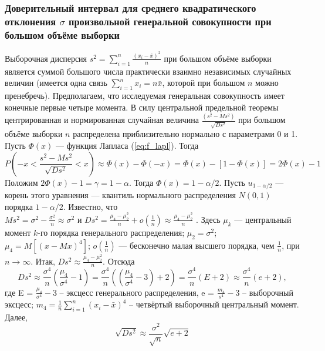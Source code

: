 \subsubsection{Доверительный интервал для среднего квадратического отклонения $\sigma$ произвольной генеральной совокупности при большом объёме выборки}
Выборочная дисперсия $s^{2} = \sum_{i = 1}^{n}{\frac{(x_{i} - \bar{x})^{2}}{n}}$ при большом объёме выборки является суммой большого числа практически взаимно независимых случайных величин (имеется одна связь $\sum_{i=1}^{n}{x_{i}} = n\bar{x}$, которой при большом $n$ можно пренебречь). Предполагаем, что исследуемая генеральная совокупность имеет конечные первые четыре момента.
\newline
В силу центральной предельной теоремы центрированная и нормированная случайная величина $\frac{(s^{2}-Ms^{2})}{\sqrt{D s^{2}}}$ при большом объёме выборки $n$ распределена приблизительно нормально с параметрами 0 и 1. Пусть $\Phi(x)$ — функция Лапласа (\ref{eq:f_lapl}). Тогда
\begin{equation}
	P\left(-x < \frac{s^{2}-Ms^{2}}{\sqrt{D s^{2}}} < x\right)
	\approx \Phi(x) - \Phi(-x)=\Phi(x) - [1 - \Phi(x)] = 2\Phi(x) - 1
	\label{eq:P_as_sigma}
\end{equation}
Положим $2\Phi(x)-1 = \gamma = 1-\alpha$. Тогда $\Phi(x) = 1-\alpha/2$. Пусть $u_{1-\alpha/2}$ — корень этого уравнения — квантиль нормального распределения $N(0,1)$ порядка $1-\alpha/2$. Известно, что $Ms^{2} = \sigma^{2} -\frac{\sigma^{2}}{n} \approx \sigma^{2} \text{ и } D s^{2} = \frac{\mu_{4} -\mu_{2}^{2}}{n} + o(\frac{1}{n}) \approx \frac{\mu_{4} -\mu_{2}^{2}}{n}$ . Здесь $\mu_{k}$ — центральный момент $k$-го порядка генерального распределения; $\mu_{2} = \sigma^{2}$; $\mu_{4} = M[(x-M x)^{4}]$︀; $o(\frac{1}{n})$ — бесконечно малая высшего порядка, чем $\frac{1}{n}$, при $n\rightarrow \infty$. Итак, $D s^{2} \approx \frac{\mu_{4} -\mu_{2}^{2}}{n}$. Отсюда
\begin{equation}
	D s^{2} \approx \frac{\sigma^{4}}{n}(\frac{\mu_{4}}{\sigma^{4}} - 1) = 
	\frac{\sigma^{4}}{n}((\frac{\mu_{4}}{\sigma^{4}} - 3) + 2) = \frac{\sigma^{4}}{n}(E + 2) \approx \frac{\sigma^{4}}{n}(e + 2),
	\label{eq:Ds_2}
\end{equation}
где E = $\frac{\mu_{4}}{\sigma^{4}} - 3$ -- эксцесс генерального распределения, e = $\frac{m_{4}}{s^{4}} - 3$ -- выборочный эксцесс; $m_{4} = \frac{1}{n}\sum_{i =1}^{n}{(x_{i} - \bar{x})^{4}}$ -- четвёртый выборочный центральный момент. Далее,
\begin{equation}
	\sqrt{D s^{2}} \approx \frac{\sigma^{2}}{\sqrt{n}}\sqrt{e + 2}
	\label{eq:sqrt_Ds}
\end{equation}
